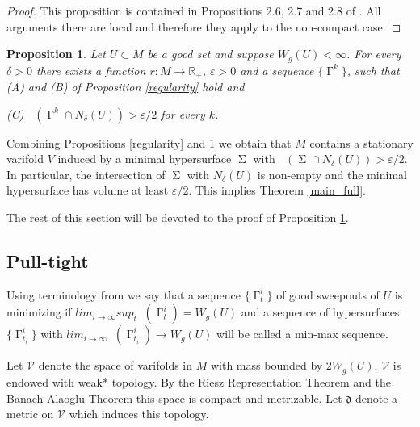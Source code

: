 \documentclass[12pt]{amsart}
\newtheorem{proposition}[theorem]{Proposition}
\DeclareMathOperator{\Hn}{\mathcal{H}^n}
\DeclareMathOperator{\G}{\Gamma}
\DeclareMathOperator{\Si}{\Sigma}
\theoremstyle{definition}
\newtheorem{remark}[theorem]{Remark}
\begin{document}
\begin{proof}
This proposition is contained in Propositions 2.6, 2.7 and 2.8 of 
\cite{DT}. All arguments there are local and therefore they apply
to the non-compact case. 
\end{proof}



\begin{proposition} \label{sequence existence}
Let $U \subset M$ be a good set and suppose $W_g(U)< \infty$.
For every $\delta>0$ there exists a function $r:M \rightarrow \mathbb{R}_+$,
$\varepsilon>0$
and a sequence $\{ \G^k \}$,
such that  (A) and (B) of Proposition \ref*{regularity}
hold and

(C) $\Hn(\G^k \cap N_{\delta}(U)) > \varepsilon/2$ for every $k$.

\end{proposition}



Combining Propositions \ref*{regularity} and \ref*{sequence existence}
we obtain that $M$ contains a stationary varifold $V$ induced by a minimal hypersurface $\Si$
with $\Hn(\Si \cap N_{\delta}(U)) > \varepsilon/2$. In particular, the intersection 
of $\Si$ with $N_{\delta}(U)$ is non-empty and the minimal hypersurface has volume at
least $\varepsilon/2$.
This implies Theorem \ref*{main_full}.

The rest of this section will be devoted to the proof of Proposition \ref*{sequence existence}.

\subsection{Pull-tight}




Using terminology from \cite{DT}
we say that a sequence $\{ \G_t^i \}$
of good sweepouts
of $U$ is minimizing if 
$lim_{i \rightarrow \infty} 
sup_t \Hn(\G_t^i) = W_g(U)$
and a sequence of hypersurfaces
$\{ \G_{t_i}^i \}$ with
$lim_{i \rightarrow \infty} \Hn(\G_{t_i}^i) \rightarrow W_g(U)$
will be called a min-max sequence.

Let $\mathcal{V}$ denote the space of varifolds
in $M$ with mass bounded by $2W_g(U)$.
$\mathcal{V}$ is endowed with weak* topology.
By the Riesz Representation Theorem and
the Banach-Alaoglu Theorem
this space is compact and metrizable. Let $\mathfrak{d}$ denote
a metric on $\mathcal{V}$ which induces this topology. 
\end{document}
